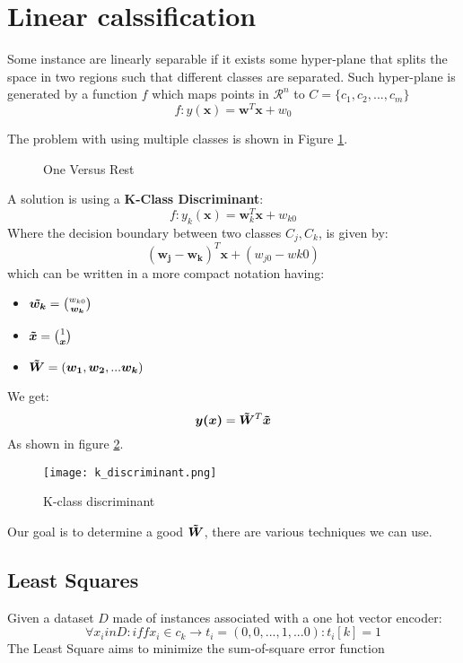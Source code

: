 


\section{Linear calssification}
Some instance are linearly separable if it exists some hyper-plane that splits the space in two regions such that different classes are separated. Such hyper-plane is generated by a function $f$ which maps points in $\mathcal{R}^n$ to $C=\lbrace c_1,c_2,...,c_m\rbrace$
\[f: y(\bm{x})=\bm{w}^T\bm{x}+w_0\]


The problem with using multiple classes is shown in Figure \ref{fig:linear_problem}.


\begin{figure}[H]
    \centering
    \qquad
    \caption{One Versus Rest }

\label{fig:linear_problem}%

\end{figure}


A solution is using a \textbf{K-Class Discriminant}:
\[f: y_k(\bm{x})=\bm{w}_k^T\bm{x}+w_{k0}\]
Where the decision boundary between two classes $C_j,C_k$, is given by:
\[(\bm{w_j}-\bm{w_k})^T\bm{x}+(w_{j0}-w{k0})\]
which can be written in a more compact notation having:
\begin{itemize}
\item $\bm{\tilde{w_k}}=\binom{w_{k0}}{\bm{w_k}}$
\item $\bm{\tilde{x}}=\binom{1}{\bm{x}}$
\item $\bm{\tilde{W}}=(\bm{w_1},\bm{w_2},...\bm{w_k})$
\end{itemize}
We get:
\[\bm{y(x)}=\bm{\tilde{W}}^T\bm{\tilde{x}}\]
As shown in figure \ref{fig:k_discriminant}.

\begin{figure}[H]
\texttt{[image: k\_discriminant.png]}
\caption{K-class discriminant}
\label{fig:k_discriminant}
\end{figure}

Our goal is to determine a good $\bm{\tilde{W}}$, there are various techniques we can use.

\subsection{Least Squares}
Given a dataset $D$ made of instances associated with a one hot vector encoder:
\[\forall x_i in D: iff x_i \in c_k \rightarrow t_i=(0,0,...,1,...0): t_i[k]=1\]
The Least Square aims to minimize the sum-of-square error function


